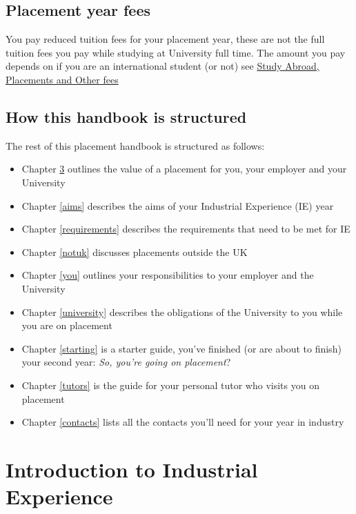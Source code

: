 \documentclass[
]{book}
\providecommand{\tightlist}{%
  \setlength{\itemsep}{0pt}\setlength{\parskip}{0pt}}
\begin{document}
\section{Placement year fees}\label{fees}

You pay reduced tuition fees for your placement year, these are not the full tuition fees you pay while studying at University full time. The amount you pay depends on if you are an international student (or not) see \href{https://www.studentsupport.manchester.ac.uk/finances/tuition-fees/fee-amounts/other-fees/}{Study Abroad, Placements and Other fees} \citep{fees}

\section{How this handbook is structured}\label{guide}

The rest of this placement handbook is structured as follows:

\begin{itemize}
\tightlist
\item
  Chapter \ref{intro} outlines the value of a placement for you, your employer and your University
\item
  Chapter \ref{aims} describes the aims of your Industrial Experience (IE) year
\item
  Chapter \ref{requirements} describes the requirements that need to be met for IE
\item
  Chapter \ref{notuk} discusses placements outside the UK
\item
  Chapter \ref{you} outlines your responsibilities to your employer and the University
\item
  Chapter \ref{university} describes the obligations of the University to you while you are on placement
\item
  Chapter \ref{starting} is a starter guide, you've finished (or are about to finish) your second year: \emph{So, you're going on placement}?
\item
  Chapter \ref{tutors} is the guide for your personal tutor who visits you on placement
\item
  Chapter \ref{contacts} lists all the contacts you'll need for your year in industry
\end{itemize}

\chapter{Introduction to Industrial Experience}\label{intro}
\end{document}
